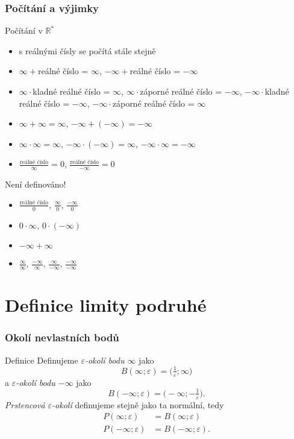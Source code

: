 \documentclass[handout]%
{beamer}
\newcommand{\R}{\mathbb R}
\begin{document}
\begin{frame}
	\frametitle{Počítání a výjimky}
	\begin{block}{Počítání v $\R^*$}
	\footnotesize
	\begin{itemize}
		\item s  reálnými čísly se počítá stále stejně
		\item $\infty + {}$reálné číslo =  $\infty$,  $-\infty + {}$reálné číslo =  $-\infty$
		\item $\infty \cdot {}$kladné reálné číslo = $\infty$,  $\infty \cdot {}$záporné reálné číslo = $-\infty$, 
			$-\infty \cdot {}$kladné reálné číslo = $-\infty$, $-\infty \cdot {}$záporné reálné číslo = $\infty$
		\item $\infty + \infty = \infty$, $-\infty + (-\infty) = -\infty$
		\item $\infty \cdot \infty = \infty$, $-\infty \cdot (-\infty) = \infty$, $-\infty \cdot \infty = -\infty$
		\item $\frac{\text{reálné číslo}}{\infty} = 0$, $\frac{\text{reálné číslo}}{-\infty} = 0$
	\end{itemize}
	\end{block}
	\pause
	\vskip-2mm
	\begin{alertblock}{Není definováno!}\let\pause\relax \pause
	\begin{itemize}
		\item $\frac{\text{reálné číslo}}{0}$, $\frac{\infty}{0}$, $\frac{-\infty}{0}$\pause
		\item $0 \cdot \infty$, $0 \cdot (-\infty)$\pause
		\item $-\infty + \infty$\pause
		\item $\frac{\infty}{\infty}$, $\frac{-\infty}{\infty}$, $\frac{\infty}{-\infty}$, $\frac{-\infty}{-\infty}$
	\end{itemize}
	\end{alertblock}
\end{frame}


\section{Definice limity podruhé}


\begin{frame}
	\frametitle{Okolí nevlastních bodů}\pause
	\begin{block}{Definice}
	Definujeme \emph{$\varepsilon$-okolí bodu $\infty$} jako
	\[ B(\infty; \varepsilon) = \bigl(\tfrac1\varepsilon; \infty\bigr) \]\pause
	a \emph{$\varepsilon$-okolí bodu $-\infty$} jako
	\[ B(-\infty; \varepsilon) = \bigl(-\infty; -\tfrac1\varepsilon\bigr). \]\pause
	\emph{Prstencová $\varepsilon$-okolí} definujeme \alert{stejně} jako ta normální, tedy
	\begin{align*}
	P(\infty; \varepsilon) &= B(\infty; \varepsilon)\\
	P(-\infty; \varepsilon) &= B(-\infty; \varepsilon).
	\end{align*}
	\end{block}
\end{frame}
\end{document}
